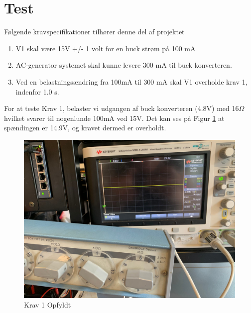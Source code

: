\documentclass[../main.tex]{subfiles}
\begin{document}
\section{Test}
Følgende kravspecifikationer tilhører denne del af projektet
\begin{enumerate}
  \item V1 skal være 15V +/- 1 volt for en buck strøm på 100 mA
  \item AC-generator systemet skal kunne levere 300 mA til buck konverteren.
  \item Ved en belastningsændring fra 100mA til 300 mA skal V1 overholde krav 1, indenfor 1.0 s.
\end{enumerate}

For at teste Krav 1, belaster vi udgangen af buck konverteren (4.8V) med 16$\Omega$ hvilket svarer til nogenlunde 100mA ved 15V. Det kan ses på Figur \ref{fig: Krav 1 Opfyldt} at spændingen er 14.9V, og kravet dermed er overholdt.
\begin{figure}[H]
      \includegraphics[width=\textwidth]{Dokumentation/Pictures/Krav1.jpg}
     \caption{Krav 1 Opfyldt}
     \label{fig: Krav 1 Opfyldt}
     \end{figure}
\end{document}
